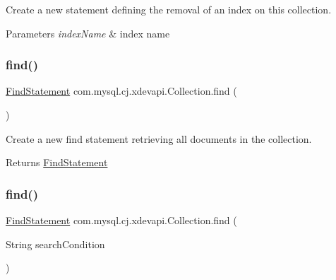 Create a new statement defining the removal of an index on this collection.


\begin{DoxyParams}{Parameters}
{\em index\+Name} & index name \\
\hline
\end{DoxyParams}
\mbox{\label{interfacecom_1_1mysql_1_1cj_1_1xdevapi_1_1_collection_acb0746735df861e86f37d50f4a6b67f0}} 
\subsubsection{\texorpdfstring{find()}{find()}\hspace{0.1cm}{\footnotesize\ttfamily [1/2]}}
{\footnotesize\ttfamily \mbox{\hyperlink{interfacecom_1_1mysql_1_1cj_1_1xdevapi_1_1_find_statement}{Find\+Statement}} com.\+mysql.\+cj.\+xdevapi.\+Collection.\+find (\begin{DoxyParamCaption}{ }\end{DoxyParamCaption})}

Create a new find statement retrieving all documents in the collection.

\begin{DoxyReturn}{Returns}
\mbox{\hyperlink{interfacecom_1_1mysql_1_1cj_1_1xdevapi_1_1_find_statement}{Find\+Statement}} 
\end{DoxyReturn}
\mbox{\label{interfacecom_1_1mysql_1_1cj_1_1xdevapi_1_1_collection_a3d2d6fba415d80c26d525057f628f45f}} 
\subsubsection{\texorpdfstring{find()}{find()}\hspace{0.1cm}{\footnotesize\ttfamily [2/2]}}
{\footnotesize\ttfamily \mbox{\hyperlink{interfacecom_1_1mysql_1_1cj_1_1xdevapi_1_1_find_statement}{Find\+Statement}} com.\+mysql.\+cj.\+xdevapi.\+Collection.\+find (\begin{DoxyParamCaption}\item[{String}]{search\+Condition }\end{DoxyParamCaption})}

